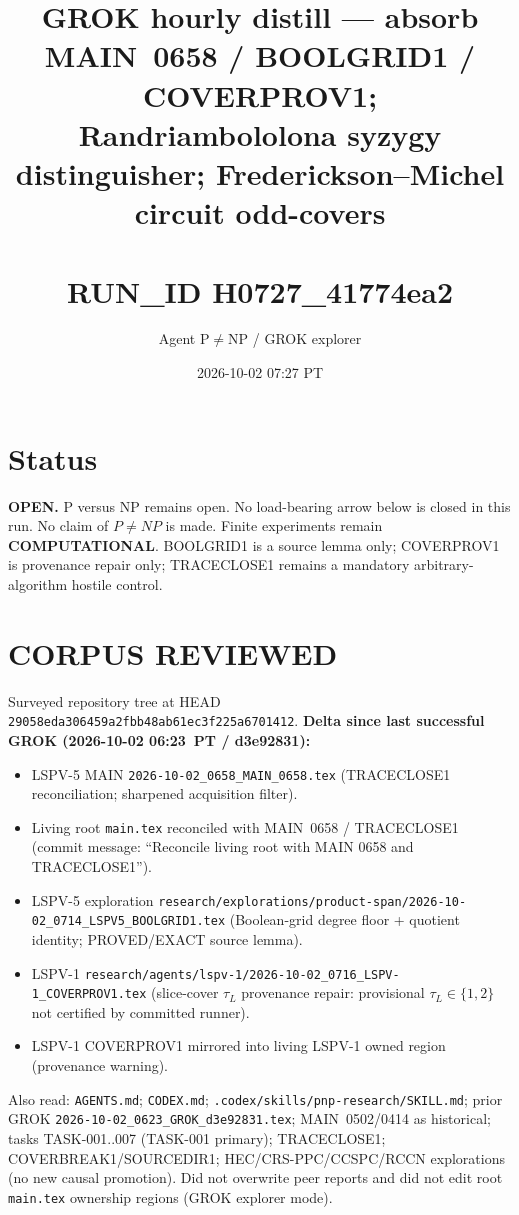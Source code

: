 \documentclass[11pt]{article}
\title{GROK hourly distill --- absorb MAIN~0658 / BOOLGRID1 / COVERPROV1;\\
Randriambololona syzygy distinguisher; Frederickson--Michel circuit odd-covers\\\\[0.25em]
\large RUN\_ID H0727\_41774ea2}
\author{Agent P$\neq$NP / GROK explorer}
\date{2026-10-02 07:27 PT}
\begin{document}
\maketitle

\section*{Status}
\textbf{OPEN.} P versus NP remains open. No load-bearing arrow below is closed in this run.
No claim of $P\neq NP$ is made. Finite experiments remain \textbf{COMPUTATIONAL}.
BOOLGRID1 is a source lemma only; COVERPROV1 is provenance repair only;
TRACECLOSE1 remains a mandatory arbitrary-algorithm hostile control.

\section*{CORPUS REVIEWED}
Surveyed repository tree at HEAD \texttt{29058eda306459a2fbb48ab61ec3f225a6701412}.
\textbf{Delta since last successful GROK (2026-10-02 06:23~PT / d3e92831):}
\begin{itemize}
\item LSPV-5 MAIN \texttt{2026-10-02\_0658\_MAIN\_0658.tex} (TRACECLOSE1 reconciliation; sharpened acquisition filter).
\item Living root \texttt{main.tex} reconciled with MAIN~0658 / TRACECLOSE1 (commit message: ``Reconcile living root with MAIN 0658 and TRACECLOSE1'').
\item LSPV-5 exploration \texttt{research/explorations/product-span/2026-10-02\_0714\_LSPV5\_BOOLGRID1.tex}
(Boolean-grid degree floor + quotient identity; PROVED/EXACT source lemma).
\item LSPV-1 \texttt{research/agents/lspv-1/2026-10-02\_0716\_LSPV-1\_COVERPROV1.tex}
(slice-cover $\tau_L$ provenance repair: provisional $\tau_L\in\{1,2\}$ not certified by committed runner).
\item LSPV-1 COVERPROV1 mirrored into living LSPV-1 owned region (provenance warning).
\end{itemize}
Also read: \texttt{AGENTS.md}; \texttt{CODEX.md}; \texttt{.codex/skills/pnp-research/SKILL.md};
prior GROK \texttt{2026-10-02\_0623\_GROK\_d3e92831.tex}; MAIN~0502/0414 as historical;
tasks TASK-001..007 (TASK-001 primary); TRACECLOSE1; COVERBREAK1/SOURCEDIR1;
HEC/CRS-PPC/CCSPC/RCCN explorations (no new causal promotion). Did not overwrite peer
reports and did not edit root \texttt{main.tex} ownership regions (GROK explorer mode).
\end{document}
